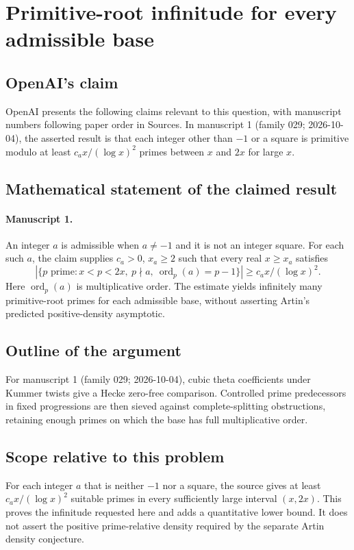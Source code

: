 \documentclass[11pt]{article}
\begin{document}
\section*{Primitive-root infinitude for every admissible base}

\subsection{OpenAI's claim}
OpenAI presents the following claims relevant to this question, with manuscript numbers following paper order in Sources. In manuscript 1 (family 029; 2026-10-04), the asserted result is that each integer other than $-1$ or a square is primitive modulo at least $c_a x/(\log x)^2$ primes between $x$ and $2x$ for large $x$.

\subsection{Mathematical statement of the claimed result}
\paragraph{Manuscript 1.}
An integer $a$ is admissible when $a\ne-1$ and it is not an integer square. For each such $a$, the claim supplies $c_a>0$, $x_a\ge2$ such that every real $x\ge x_a$ satisfies
\[
 |\{p\text{ prime}:x<p<2x,\ p\nmid a,\ \operatorname{ord}_p(a)=p-1\}|
 \ge c_a x/(\log x)^2.
\]
Here $\operatorname{ord}_p(a)$ is multiplicative order. The estimate yields infinitely many primitive-root primes for each admissible base, without asserting Artin's predicted positive-density asymptotic.

\subsection{Outline of the argument}
For manuscript 1 (family 029; 2026-10-04), cubic theta coefficients under Kummer twists give a Hecke zero-free comparison. Controlled prime predecessors in fixed progressions are then sieved against complete-splitting obstructions, retaining enough primes on which the base has full multiplicative order.

\subsection{Scope relative to this problem}
For each integer $a$ that is neither $-1$ nor a square, the source gives at least $c_a x/(\log x)^2$ suitable primes in every sufficiently large interval $(x,2x)$. This proves the infinitude requested here and adds a quantitative lower bound. It does not assert the positive prime-relative density required by the separate Artin density conjecture.
\end{document}
